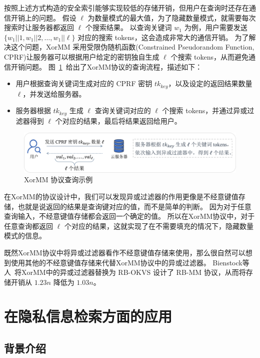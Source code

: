 按照上述方式构造的安全索引能够实现较低的存储开销，但用户在查询时还存在通信开销上的问题。
假设 $\ell$ 为数量模式的最大值，为了隐藏数量模式，就需要每次搜索时让服务器都返回 $\ell$ 个搜索结果。
以查询关键词 $w_1$ 为例，用户需要发送 $\{w_1 || 1, w_1 ||2, \dots, w_1 || \ell \}$ 对应的搜索 tokens，这会造成非常大的通信开销。
为了解决这个问题，XorMM 采用受限伪随机函数(Constrained Pseudorandom Function, CPRF)让服务器可以根据用户给定的密钥独自生成 $\ell$ 个搜索 tokens，从而避免通信开销问题。
图~\ref{fig:xormm_example}~给出了XorMM协议的查询流程，描述如下：
\begin{itemize}
  \item 用户根据查询关键词生成对应的 CPRF 密钥 $tk_{key}$，以及设定的返回结果数量 $\ell$，并发送给服务器。
  \item 服务器根据 $tk_{key}$ 生成 $\ell$ 查询关键词对应的 $\ell$ 个搜索 tokens，并通过异或过滤器得到 $\ell$ 个对应的结果，最后将结果返回给用户。
\end{itemize}
\begin{figure}[ht]
  \centering
  \includegraphics[width=\textwidth]{figures/xormm_exp.pdf}
  \caption{XorMM 协议查询示例}
  \label{fig:xormm_example}
\end{figure}

在XorMM的协议设计中，我们可以发现异或过滤器的作用更像是不经意键值存储，也就是说返回的结果是查询键对应的值，而不是简单的判断。
因为对于任意查询输入，不经意键值存储都会返回一个确定的值。
所以在XorMM协议中，对于任意查询都返回 $\ell$ 个对应的结果，这就实现了在不需要填充的情况下，隐藏数量模式的信息。

既然XorMM协议中将异或过滤器看作不经意键值存储来使用，那么很自然可以想到使用其他的不经意键值存储来代替XorMM协议中的异或过滤器。
Bienstock等人~\cite{bienstock2023NearOptimal}将XorMM中的异或过滤器替换为 RB-OKVS 设计了 RB-MM 协议，从而将存储开销从 $1.23n$ 降低为 $1.03n$。

\section{在隐私信息检索方面的应用}

\subsection{背景介绍}

